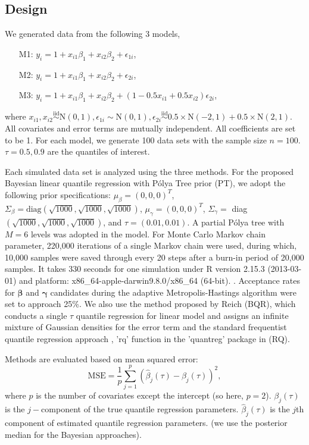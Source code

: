 \documentclass[12pt]{article}
\newcommand{\polya}{P\'{o}lya}
\begin{document}
\subsection{Design}
We generated data from the following 3 models,
\begin{itemize}
\item [M1:] $y_i = 1 + x_{i1}\beta_1 + x_{i2}\beta_2 + \epsilon_{1i}$,
\item [M2:] $y_i = 1 + x_{i1}\beta_1 + x_{i2}\beta_2 + \epsilon_{2i}$,
\item [M3:] $y_i = 1 + x_{i1}\beta_1 + x_{i2}\beta_2 +
  (1-0.5x_{i1}+0.5x_{i2}) \epsilon_{2i}$,
\end{itemize}
where $x_{i1} , x_{i2} \stackrel{\text{iid}}{\sim} \mathrm{N}(0,1),
\epsilon_{1i} \sim \mathrm{N}(0,1), \epsilon_{2i}
\stackrel{\text{iid}}{\sim} 0.5 \times \mathrm{N}(-2,1) + 0.5 \times
\mathrm{N}(2,1) $. All covariates and error terms are mutually
independent. All coefficients are set to be 1. For each model, we
generate 100 data sets with the sample size $n=100$. $\tau=0.5, 0.9$
are the quantiles of interest.

Each simulated data set is analyzed using the three methods. For the
proposed Bayesian linear quantile regression with \polya{} Tree prior
(PT), we adopt the following prior specifications: $\mu_{\beta} =
(0,0,0)^T$, $\Sigma_{\beta}=\text{diag}
(\sqrt{1000},\sqrt{1000},\sqrt{1000})$, $\mu_{\gamma} = (0,0,0)^T$,
$\Sigma_{\gamma}=$ diag $(\sqrt{1000},\sqrt{1000},\sqrt{1000})$, and
$\tau=(0.01, 0.01)$. A partial \polya{} tree with $M=6$ levels was
adopted in the model. For Monte Carlo Markov chain parameter, 220,000
iterations of a single Markov chain were used, during which, 10,000
samples were saved through every 20 steps after a burn-in period of
20,000 samples.  It takes 330 seconds for one simulation under R
version 2.15.3 (2013-03-01) and platform:
x86\_64-apple-darwin9.8.0/x86\_64 (64-bit).  . Acceptance rates for
$\bm{\beta}$ and $\bm{\gamma}$ candidates during the adaptive
Metropolis-Hastings algorithm were set to approach 25\%.  We also use
the method proposed by Reich (BQR), which conducts a single $\tau$
quantile regression for linear model and assigns an infinite mixture
of Gaussian densities for the error term and the standard frequentist
quantile regression approach , 'rq' function in the 'quantreg' package
in \cite{R} (RQ).

Methods are evaluated based on mean squared error:
\begin{displaymath}
  \text{MSE}  = \frac{1}{p} \sum_{j=1}^p (\hat{\beta}_j(\tau) -
  \beta_j(\tau))^2,
\end{displaymath}
where $p$ is the number of covariates except the intercept (so here,
$p=2$). $\beta_j(\tau)$ is the $j-$component of the true quantile
regression parameters. $\hat{\beta}_j(\tau)$ is the $j$th component of
estimated quantile regression parameters. (we use the posterior median
for the Bayesian approaches).
\end{document}
